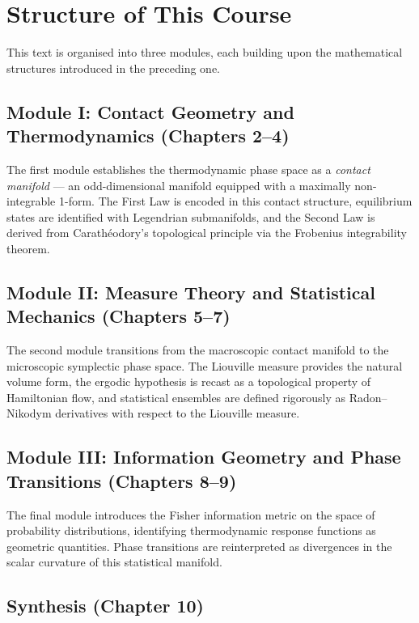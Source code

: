 \section{Structure of This Course}

This text is organised into three modules, each building upon the mathematical structures introduced in the preceding one.

\subsection{Module I: Contact Geometry and Thermodynamics (Chapters 2--4)}

The first module establishes the thermodynamic phase space as a \emph{contact manifold} --- an odd-dimensional manifold equipped with a maximally non-integrable 1-form. The First Law is encoded in this contact structure, equilibrium states are identified with Legendrian submanifolds, and the Second Law is derived from Carath\'eodory's topological principle via the Frobenius integrability theorem.

\subsection{Module II: Measure Theory and Statistical Mechanics (Chapters 5--7)}

The second module transitions from the macroscopic contact manifold to the microscopic symplectic phase space. The Liouville measure provides the natural volume form, the ergodic hypothesis is recast as a topological property of Hamiltonian flow, and statistical ensembles are defined rigorously as Radon--Nikodym derivatives with respect to the Liouville measure.

\subsection{Module III: Information Geometry and Phase Transitions (Chapters 8--9)}

The final module introduces the Fisher information metric on the space of probability distributions, identifying thermodynamic response functions as geometric quantities. Phase transitions are reinterpreted as divergences in the scalar curvature of this statistical manifold.

\subsection{Synthesis (Chapter 10)}


